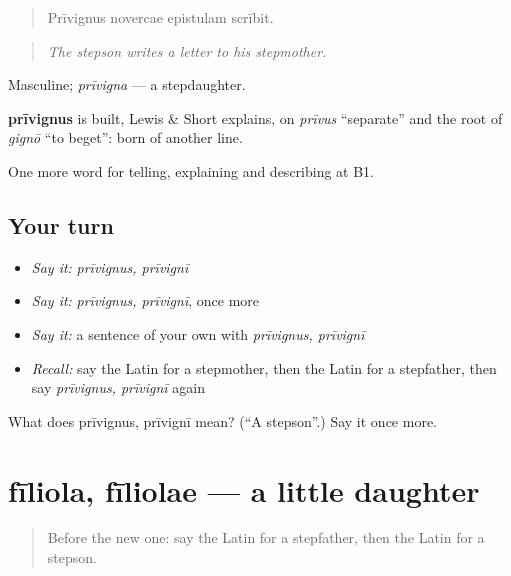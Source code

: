 \begin{quote}
Prīvignus novercae epistulam scrībit.
\end{quote}

\begin{quote}
\emph{The stepson writes a letter to his stepmother.}
\end{quote}

Masculine; \emph{prīvigna} — a stepdaughter.

\begin{cousinweb}
\textbf{prīvignus} is built, Lewis \& Short explains, on \emph{prīvus} \textquotedblleft{}separate\textquotedblright{} and the root of \emph{gignō} \textquotedblleft{}to beget\textquotedblright{}: born of another line.
\end{cousinweb}

\begin{grammarlens}[title={What you've built}]
One more word for telling, explaining and describing at B1.
\end{grammarlens}

\subsection*{Your turn}
\begin{itemize}
\raggedright
  \item \emph{Say it:} \emph{prīvignus, prīvignī}
  \item \emph{Say it:} \emph{prīvignus, prīvignī}, once more
  \item \emph{Say it:} a sentence of your own with \emph{prīvignus, prīvignī}
  \item \emph{Recall:} say the Latin for a stepmother, then the Latin for a stepfather, then say \emph{prīvignus, prīvignī} again
\end{itemize}

\begin{tcolorbox}[breakable,colback=teal!4,colframe=teal!35!black,title={Before you move on}]
What does prīvignus, prīvignī mean? (\textquotedblleft{}A stepson\textquotedblright{}.) Say it once more.
\end{tcolorbox}
\section[fīliola, fīliolae]{fīliola, fīliolae — a little daughter}

\label{lesson:LA-C529-filiola}



\begin{quote}
Before the new one: say the Latin for a stepfather, then the Latin for a stepson.
\end{quote}

